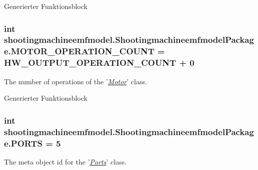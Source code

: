 Generierter Funktionsblock  \hypertarget{interfaceshootingmachineemfmodel_1_1_shootingmachineemfmodel_package_ace2679b1f358734d8936489db75b5a35}{
\subsubsection[{M\-O\-T\-O\-R\-\_\-\-O\-P\-E\-R\-A\-T\-I\-O\-N\-\_\-\-C\-O\-U\-N\-T}]{\setlength{\rightskip}{0pt plus 5cm}int shootingmachineemfmodel.\-Shootingmachineemfmodel\-Package.\-M\-O\-T\-O\-R\-\_\-\-O\-P\-E\-R\-A\-T\-I\-O\-N\-\_\-\-C\-O\-U\-N\-T = {\bf H\-W\-\_\-\-O\-U\-T\-P\-U\-T\-\_\-\-O\-P\-E\-R\-A\-T\-I\-O\-N\-\_\-\-C\-O\-U\-N\-T} + 0}}\label{interfaceshootingmachineemfmodel_1_1_shootingmachineemfmodel_package_ace2679b1f358734d8936489db75b5a35}
The number of operations of the '{\itshape \hyperlink{interfaceshootingmachineemfmodel_1_1_motor}{Motor}}' class.

Generierter Funktionsblock  \hypertarget{interfaceshootingmachineemfmodel_1_1_shootingmachineemfmodel_package_a18bf82e2b562ca96327f1cb2b4a5e990}{
\subsubsection[{P\-O\-R\-T\-S}]{\setlength{\rightskip}{0pt plus 5cm}int shootingmachineemfmodel.\-Shootingmachineemfmodel\-Package.\-P\-O\-R\-T\-S = 5}}\label{interfaceshootingmachineemfmodel_1_1_shootingmachineemfmodel_package_a18bf82e2b562ca96327f1cb2b4a5e990}
The meta object id for the '\hyperlink{classshootingmachineemfmodel_1_1impl_1_1_ports_impl}{{\itshape Ports}}' class.

